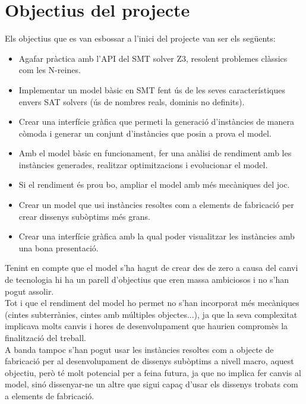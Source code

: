 \section{Objectius del projecte}
Els objectius que es van esbossar a l'inici del projecte van ser els següents:
\begin{itemize}
    \item Agafar pràctica amb l'API del SMT solver Z3, resolent problemes clàssics com les N-reines.
    \item Implementar un model bàsic en SMT fent ús de les seves característiques envers SAT solvers (ús de nombres reals, dominis no definits).
    \item Crear una interfície gràfica que permeti la generació d'instàncies de manera còmoda i generar un conjunt d'instàncies que posin a prova el model.
    \item Amb el model bàsic en funcionament, fer una anàlisi de rendiment amb les instàncies generades, realitzar optimitzacions i evolucionar el model.
    \item Si el rendiment és prou bo, ampliar el model amb més mecàniques del joc.
    \item Crear un model que usi instàncies resoltes com a elements de fabricació per crear dissenys subòptims més grans.
    \item Crear una interfície gràfica amb la qual poder visualitzar les instàncies amb una bona presentació.
\end{itemize}

Tenint en compte que el model s'ha hagut de crear des de zero a causa del canvi de tecnologia hi ha un parell d'objectius que eren massa ambiciosos i no s'han pogut assolir.\\ Tot i que el rendiment del model ho permet no s'han incorporat més mecàniques (cintes subterrànies, cintes amb múltiples objectes...), ja que la seva complexitat implicava molts canvis i hores de desenvolupament que haurien compromès la finalització del treball.\\ A banda tampoc s'han pogut usar les instàncies resoltes com a objecte de fabricació per al desenvolupament de dissenys subòptims a nivell macro, aquest objectiu, però té molt potencial per a feina futura, ja que no implica fer canvis al model, sinó dissenyar-ne un altre que sigui capaç d'usar els dissenys trobats com a elements de fabricació.